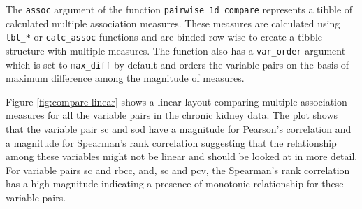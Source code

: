 The \texttt{assoc} argument of the function
\texttt{pairwise\_1d\_compare} represents a tibble of calculated
multiple association measures. These measures are calculated using
\texttt{tbl\_*} or \texttt{calc\_assoc} functions and are binded row
wise to create a tibble structure with multiple measures. The function
also has a \texttt{var\_order} argument which is set to
\texttt{max\_diff} by default and orders the variable pairs on the basis
of maximum difference among the magnitude of measures.

Figure \ref{fig:compare-linear} shows a linear layout comparing multiple
association measures for all the variable pairs in the chronic kidney
data. The plot shows that the variable pair sc and sod have a magnitude
for Pearson's correlation and a magnitude for Spearman's rank
correlation suggesting that the relationship among these variables might
not be linear and should be looked at in more detail. For variable pairs
sc and rbcc, and, sc and pcv, the Spearman's rank correlation has a high
magnitude indicating a presence of monotonic relationship for these
variable pairs.


